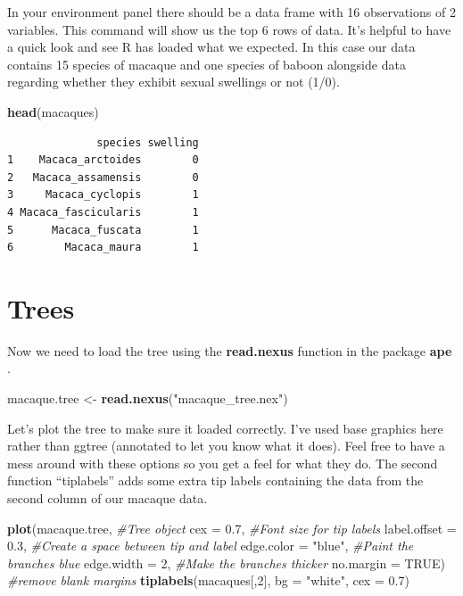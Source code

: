\documentclass[
]{book}
\newenvironment{Shaded}{\begin{snugshade}}{\end{snugshade}}
\newcommand{\CommentTok}[1]{\textcolor[rgb]{0.56,0.35,0.01}{\textit{#1}}}
\newcommand{\DataTypeTok}[1]{\textcolor[rgb]{0.13,0.29,0.53}{#1}}
\newcommand{\DecValTok}[1]{\textcolor[rgb]{0.00,0.00,0.81}{#1}}
\newcommand{\FloatTok}[1]{\textcolor[rgb]{0.00,0.00,0.81}{#1}}
\newcommand{\KeywordTok}[1]{\textcolor[rgb]{0.13,0.29,0.53}{\textbf{#1}}}
\newcommand{\NormalTok}[1]{#1}
\newcommand{\OtherTok}[1]{\textcolor[rgb]{0.56,0.35,0.01}{#1}}
\newcommand{\StringTok}[1]{\textcolor[rgb]{0.31,0.60,0.02}{#1}}
\begin{document}
In your environment panel there should be a data frame with 16 observations of 2 variables. This command will show us the top 6 rows of data. It's helpful to have a quick look and see R has loaded what we expected. In this case our data contains 15 species of macaque and one species of baboon alongside data regarding whether they exhibit sexual swellings or not (1/0).

\begin{Shaded}
\begin{Highlighting}[]
\KeywordTok{head}\NormalTok{(macaques)}
\end{Highlighting}
\end{Shaded}

\begin{verbatim}
              species swelling
1    Macaca_arctoides        0
2   Macaca_assamensis        0
3     Macaca_cyclopis        1
4 Macaca_fascicularis        1
5      Macaca_fuscata        1
6        Macaca_maura        1
\end{verbatim}

\hypertarget{trees}{%
\section{Trees}\label{trees}}

Now we need to load the tree using the \textbf{read.nexus} function in the package \textbf{ape} \citep{ape}.

\begin{Shaded}
\begin{Highlighting}[]
\NormalTok{macaque.tree \textless{}{-}}\StringTok{ }\KeywordTok{read.nexus}\NormalTok{(}\StringTok{"macaque\_tree.nex"}\NormalTok{)}
\end{Highlighting}
\end{Shaded}

Let's plot the tree to make sure it loaded correctly. I've used base graphics here rather than ggtree (annotated to let you know what it does). Feel free to have a mess around with these options so you get a feel for what they do. The second function ``tiplabels'' adds some extra tip labels containing the data from the second column of our macaque data.

\begin{Shaded}
\begin{Highlighting}[]
\KeywordTok{plot}\NormalTok{(macaque.tree,        }\CommentTok{\#Tree object}
     \DataTypeTok{cex =} \FloatTok{0.7}\NormalTok{,           }\CommentTok{\#Font size for tip labels}
     \DataTypeTok{label.offset =} \FloatTok{0.3}\NormalTok{,  }\CommentTok{\#Create a space between tip and label}
     \DataTypeTok{edge.color =} \StringTok{"blue"}\NormalTok{, }\CommentTok{\#Paint the branches blue}
     \DataTypeTok{edge.width =} \DecValTok{2}\NormalTok{,      }\CommentTok{\#Make the branches thicker}
     \DataTypeTok{no.margin =} \OtherTok{TRUE}\NormalTok{)    }\CommentTok{\#remove blank margins  }
\KeywordTok{tiplabels}\NormalTok{(macaques[,}\DecValTok{2}\NormalTok{], }\DataTypeTok{bg =} \StringTok{"white"}\NormalTok{, }\DataTypeTok{cex =} \FloatTok{0.7}\NormalTok{)}
\end{Highlighting}
\end{Shaded}
\end{document}
